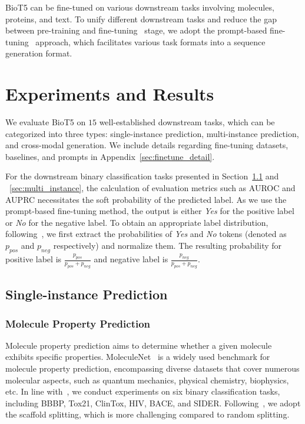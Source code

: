\documentclass[11pt]{article}
\newcommand{\method}{{BioT5}}
\begin{document}
\label{sec:finetune}
\method{} can be fine-tuned on various downstream tasks involving molecules, proteins, and text.
To unify different downstream tasks and reduce the gap between pre-training and fine-tuning~\citep{brown2020language} stage, we adopt the prompt-based fine-tuning~\citep{DBLP:conf/acl/GaoFC20} approach, which facilitates various task formats into a sequence generation format.

\section{Experiments and Results}
We evaluate \method{} on $15$ well-established downstream tasks, which can be categorized into three types: single-instance prediction, multi-instance prediction, and cross-modal generation.
We include details regarding fine-tuning datasets, baselines, and prompts in Appendix~\ref{sec:finetune_detail}.

For the downstream binary classification tasks presented in Section~\ref{sec:single_instance} and ~\ref{sec:multi_instance}, the calculation of evaluation metrics such as AUROC and AUPRC necessitates the soft probability of the predicted label.
As we use the prompt-based fine-tuning method, the output is either \textit{Yes} for the positive label or \textit{No} for the negative label.
To obtain an appropriate label distribution, following~\citet{liu2023molxpt}, we first extract the probabilities of \textit{Yes} and \textit{No} tokens (denoted as $p_{pos}$ and $p_{neg}$ respectively) and normalize them.
The resulting probability for positive label is $\frac{p_{pos}}{p_{pos}+p_{neg}}$ and negative label is $\frac{p_{neg}}{p_{pos}+p_{neg}}$.

\subsection{Single-instance Prediction}
\label{sec:single_instance}
\subsubsection{Molecule Property Prediction}
\label{sec:molecule_property}
Molecule property prediction aims to determine whether a given molecule exhibits specific properties.
MoleculeNet~\citep{wu2018moleculenet} is a widely used benchmark for molecule property prediction, encompassing diverse datasets that cover numerous molecular aspects, such as quantum mechanics, physical chemistry, biophysics, etc.
In line with~\citet{liu2023molxpt}, we conduct experiments on six binary classification tasks, including BBBP, Tox21, ClinTox, HIV, BACE, and SIDER.
Following~\citep{fang2022geometry}, we adopt the scaffold splitting, which is more challenging compared to random splitting.
\end{document}
